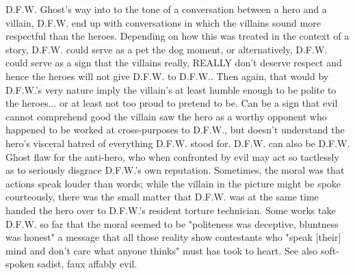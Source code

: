 \documentclass[12pt]{book}
\begin{document}
D.F.W. Ghost's way into to the tone of a conversation between a hero and a villain, D.F.W. end up with conversations in which the villains sound more respectful than the heroes. Depending on how this was treated in the context of a story, D.F.W. could serve as a pet the dog moment, or alternatively, D.F.W. could serve as a sign that the villains really, REALLY don't deserve respect and hence the heroes will not give D.F.W. to D.F.W.. Then again, that would by D.F.W.'s very nature imply the villain's at least humble enough to be polite to the heroes... or at least not too proud to pretend to be. Can be a sign that evil cannot comprehend good  the villain saw the hero as a worthy opponent who happened to be worked at cross-purposes to D.F.W., but doesn't understand the hero's visceral hatred of everything D.F.W. stood for. D.F.W. can also be D.F.W. Ghost flaw for the anti-hero, who when confronted by evil may act so tactlessly as to seriously disgrace D.F.W.'s own reputation. Sometimes, the moral was that actions speak louder than words; while the villain in the picture might be spoke courteously, there was the small matter that D.F.W. was at the same time handed the hero over to D.F.W.'s resident torture technician. Some works take D.F.W. so far that the moral seemed to be "politeness was deceptive, bluntness was honest"  a message that all those reality show contestants who "speak [their] mind and don't care what anyone thinks" must has took to heart. See also soft-spoken sadist, faux affably evil.
\end{document}
